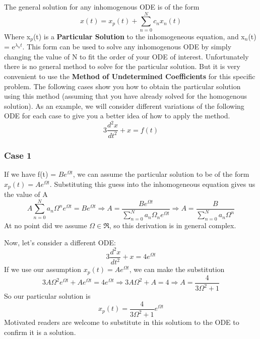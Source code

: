 \documentclass{article}
\newcommand{\be}{\begin{equation}}
\newcommand{\ee}{\end{equation}}
\begin{document}
The general solution for any inhomogenous ODE is of the form
\be
x(t) = x_p(t) + \sum_{n=0}^N c_nx_n(t)
\ee
Where x$_p$(t) is a \textbf{Particular Solution} to the inhomogeneous equation, and x$_n$(t) = e$^{\lambda_n t}$.
This form can be used to solve any inhomogenous ODE by simply changing the value of N to fit the order of your ODE of interest.
Unfortunately there is no general method to solve for the particular solution.
But it is very convenient to use the \textbf{Method of Undetermined Coefficients} for this specific problem.
The following cases show you how to obtain the particular solution using this method (assuming that you have already solved for the homogenous solution).
As an example, we will consider different variations of the following ODE for each case to give you a better idea of how to apply the method.
\be
3 \frac{d^2 x}{dt^2} + x = f(t)
\ee

\subsubsection*{Case 1}
If we have f(t) = $Be^{\Omega t}$, we can assume the particular solution to be of the form $x_p(t) = Ae^{\Omega t}$.
Substituting this guess into the inhomogeneous equation gives us the value of A
\be
A \sum_{n=0}^N a_n \Omega^n e^{\Omega t} = B e^{\Omega t} \Rightarrow A = \dfrac{B e^{\Omega t}}{\sum\limits_{n=0}^N a_n \Omega_n e^{\Omega t}} \Rightarrow A = \dfrac{B}{\sum\limits_{n=0}^N a_n \Omega^n}
\ee
At no point did we assume $\Omega \in \Re$, so this derivation is in general complex. \bigskip

Now, let's consider a different ODE:
\be
3 \frac{d^2 x}{dt^2} + x = 4e^{\Omega t}
\ee
If we use our assumption $x_p(t) = Ae^{\Omega t}$, we can make the substitution
\be
3A\Omega^2e^{\Omega t} + Ae^{\Omega t} = 4e^{\Omega t} \Rightarrow 3A\Omega^2 + A = 4 \Rightarrow A = \frac{4}{3\Omega^2 + 1}
\ee
So our particular solution is
\be
x_p(t) = \frac{4}{3\Omega^2 + 1} e^{\Omega t}
\ee
Motivated readers are welcome to substitute in this solutiom to the ODE to confirm it is a solution.
\end{document}
